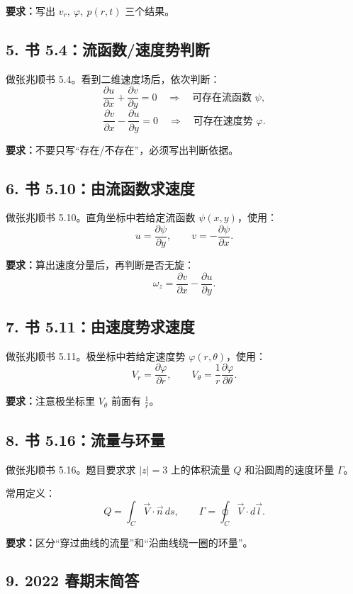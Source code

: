 \documentclass[UTF8,zihao=-4]{ctexart}
\newcommand{\task}[1]{\textbf{#1}}
\begin{document}
\task{要求：}写出 $v_r,\ \varphi,\ p(r,t)$ 三个结果。

\subsection*{5. 书 5.4：流函数/速度势判断}

做张兆顺书 5.4。看到二维速度场后，依次判断：
\[
\frac{\partial u}{\partial x}+\frac{\partial v}{\partial y}=0
\quad \Longrightarrow \quad
\text{可存在流函数 } \psi ,
\]
\[
\frac{\partial v}{\partial x}-\frac{\partial u}{\partial y}=0
\quad \Longrightarrow \quad
\text{可存在速度势 } \varphi .
\]

\task{要求：}不要只写“存在/不存在”，必须写出判断依据。

\subsection*{6. 书 5.10：由流函数求速度}

做张兆顺书 5.10。直角坐标中若给定流函数 $\psi(x,y)$，使用：
\[
u=\frac{\partial \psi}{\partial y},
\qquad
v=-\frac{\partial \psi}{\partial x}.
\]

\task{要求：}算出速度分量后，再判断是否无旋：
\[
\omega_z=\frac{\partial v}{\partial x}-\frac{\partial u}{\partial y}.
\]

\subsection*{7. 书 5.11：由速度势求速度}

做张兆顺书 5.11。极坐标中若给定速度势 $\varphi(r,\theta)$，使用：
\[
V_r=\frac{\partial\varphi}{\partial r},
\qquad
V_\theta=\frac{1}{r}\frac{\partial\varphi}{\partial\theta}.
\]

\task{要求：}注意极坐标里 $V_\theta$ 前面有 $\frac{1}{r}$。

\subsection*{8. 书 5.16：流量与环量}

做张兆顺书 5.16。题目要求求 $|z|=3$ 上的体积流量 $Q$ 和沿圆周的速度环量 $\Gamma$。

常用定义：
\[
Q=\int_C \vec V\cdot \vec n\,ds,
\qquad
\Gamma=\oint_C \vec V\cdot d\vec l.
\]

\task{要求：}区分“穿过曲线的流量”和“沿曲线绕一圈的环量”。

\subsection*{9. 2022 春期末简答}
\end{document}
